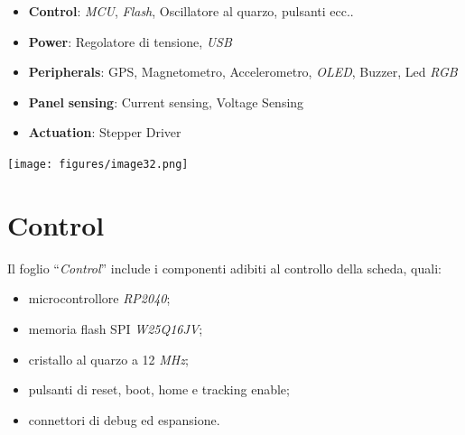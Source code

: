\begin{itemize}
\item
  
  \textbf{Control}: \emph{MCU}, \emph{Flash}, Oscillatore al quarzo,
  pulsanti ecc..
  
\item
  
  \textbf{Power}: Regolatore di tensione, \emph{USB}
  
\item
  
  \textbf{Peripherals}: GPS, Magnetometro, Accelerometro, \emph{OLED},
  Buzzer, Led \emph{RGB}
  
\item
  
  \textbf{Panel} \textbf{sensing}: Current sensing, Voltage Sensing
  
\item
  
  \textbf{Actuation}: Stepper Driver
  
\end{itemize}

\begin{center}
\texttt{[image: figures/image32.png]}
\captionsetup{type=figure}
\end{center}

\hypertarget{control}{%
\section{Control}\label{control}}

Il foglio ``\emph{Control}'' include i componenti adibiti al controllo
della scheda, quali:

\begin{itemize}
\item
  
  microcontrollore \emph{RP2040};
  
\item
  
  memoria flash SPI \emph{W25Q16JV};
  
\item
  
  cristallo al quarzo a 12 \emph{MHz};
  
\item
  
  pulsanti di reset, boot, home e tracking enable;
  
\item
  
  connettori di debug ed espansione.
  
\end{itemize}

